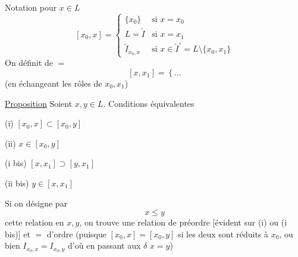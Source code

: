  Notation pour $x\in L$
\[
[x_0,x]=\left\{
\begin{array}{ll}
\{x_0\}&\text{si }x=x_0\\
L=\tilde I&\text{si }x=x_1\\
\tilde I_{x_0,x}&\text{si }x\in\tilde I^\circ=L\setminus\{x_0,x_1\}
\end{array}
\right.
\]
On définit de $=$
\[
[x,x_1]=\left\{\ldots\right.
\]
(en échangeant les rôles de $x_0,x_1$)

\uline{Proposition} Soient $x,y\in L$. Conditions équivalentes

(i) $[x_0,x]\subset[x_0,y]$

(ii) \deleted{$\unsure{\exists}$} $x\in[x_0,y]$

(i bis) $[x,x_1]\supset[y,x_1]$

(ii bis)  $y\in[x,x_1]$

Si on  désigne par
\[
x\leq y
\]
cette relation en $x,y$, on trouve une relation de  préordre [évident sur (i) ou (i bis)] et $=$ d'ordre
(puisque $[x_0,x]=[x_0,y]$
si les deux \deleted{$\unsure{\Longrightarrow}$} sont réduits à $x_0$, ou bien $I_{x_0,x}=I_{x_0,y}$ d'où en passant aux $\delta$ $x=y$)

